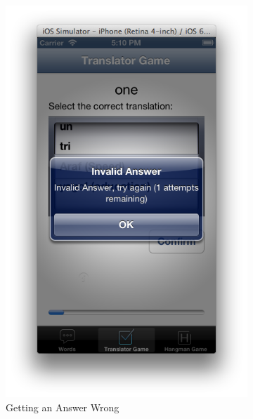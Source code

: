 \documentclass[11pt, a4paper]{article}
\begin{document}
\begin{figure}[h]
\begin{subfigure}[b]{0.3\textwidth}
\includegraphics[width=\textwidth]{img/trans-game-error}
\caption{Getting an Answer Wrong}
\end{subfigure}
\begin{subfigure}[b]{0.3\textwidth}

\end{subfigure}
\end{figure}
\end{document}
